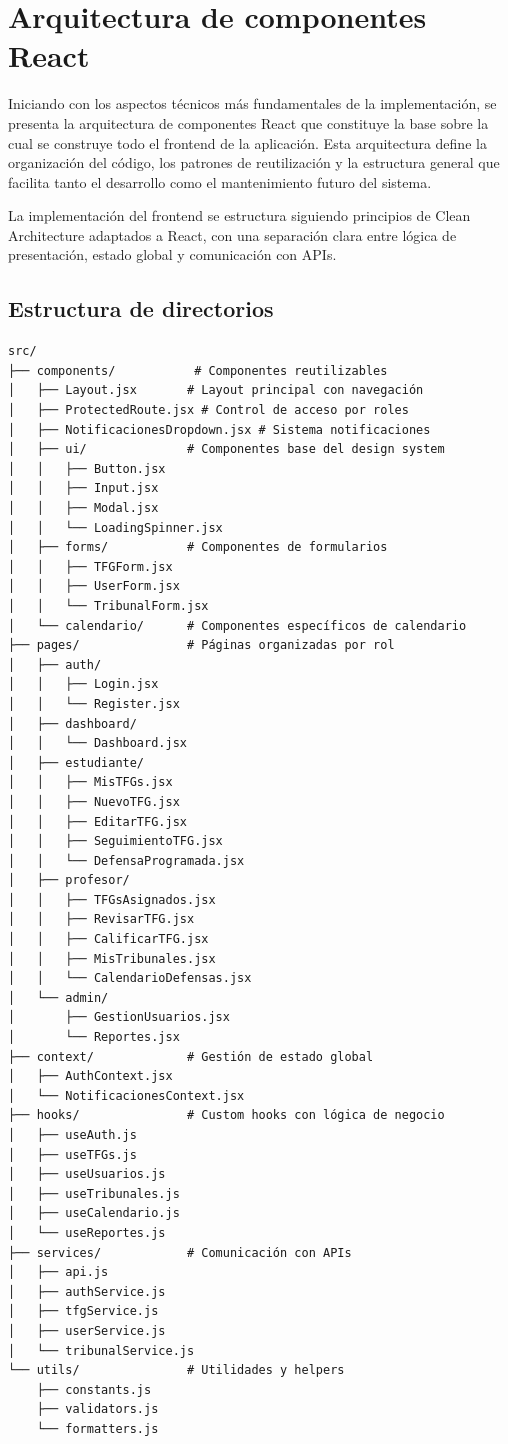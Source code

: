 \documentclass[12pt,a4paper,oneside]{report}
\begin{document}
\section{Arquitectura de componentes
React}\label{arquitectura-de-componentes-react-1}

Iniciando con los aspectos técnicos más fundamentales de la
implementación, se presenta la arquitectura de componentes React que
constituye la base sobre la cual se construye todo el frontend de la
aplicación. Esta arquitectura define la organización del código, los
patrones de reutilización y la estructura general que facilita tanto el
desarrollo como el mantenimiento futuro del sistema.

La implementación del frontend se estructura siguiendo principios de
Clean Architecture adaptados a React, con una separación clara entre
lógica de presentación, estado global y comunicación con APIs.

\subsection{Estructura de directorios}\label{estructura-de-directorios}

\begin{lstlisting}
src/
├── components/           # Componentes reutilizables
│   ├── Layout.jsx       # Layout principal con navegación
│   ├── ProtectedRoute.jsx # Control de acceso por roles
│   ├── NotificacionesDropdown.jsx # Sistema notificaciones
│   ├── ui/              # Componentes base del design system
│   │   ├── Button.jsx
│   │   ├── Input.jsx
│   │   ├── Modal.jsx
│   │   └── LoadingSpinner.jsx
│   ├── forms/           # Componentes de formularios
│   │   ├── TFGForm.jsx
│   │   ├── UserForm.jsx
│   │   └── TribunalForm.jsx
│   └── calendario/      # Componentes específicos de calendario
├── pages/               # Páginas organizadas por rol
│   ├── auth/
│   │   ├── Login.jsx
│   │   └── Register.jsx
│   ├── dashboard/
│   │   └── Dashboard.jsx
│   ├── estudiante/
│   │   ├── MisTFGs.jsx
│   │   ├── NuevoTFG.jsx
│   │   ├── EditarTFG.jsx
│   │   ├── SeguimientoTFG.jsx
│   │   └── DefensaProgramada.jsx
│   ├── profesor/
│   │   ├── TFGsAsignados.jsx
│   │   ├── RevisarTFG.jsx
│   │   ├── CalificarTFG.jsx
│   │   ├── MisTribunales.jsx
│   │   └── CalendarioDefensas.jsx
│   └── admin/
│       ├── GestionUsuarios.jsx
│       └── Reportes.jsx
├── context/             # Gestión de estado global
│   ├── AuthContext.jsx
│   └── NotificacionesContext.jsx
├── hooks/               # Custom hooks con lógica de negocio
│   ├── useAuth.js
│   ├── useTFGs.js
│   ├── useUsuarios.js
│   ├── useTribunales.js
│   ├── useCalendario.js
│   └── useReportes.js
├── services/            # Comunicación con APIs
│   ├── api.js
│   ├── authService.js
│   ├── tfgService.js
│   ├── userService.js
│   └── tribunalService.js
└── utils/               # Utilidades y helpers
    ├── constants.js
    ├── validators.js
    └── formatters.js
\end{lstlisting}
\end{document}
